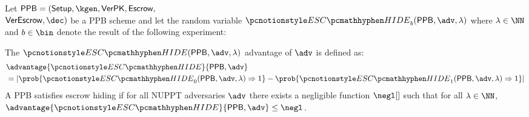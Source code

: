 \begin{definition}
	Let $\ppb = (\setup,\allowbreak \kgen,\allowbreak \verpk,\allowbreak \escrow,$\\ $\allowbreak \verescrow,\allowbreak \dec)$ be a PPB scheme and let the random variable $\eschidegame_b(\ppb, \adv, \secpar)$ where $\secpar \in \NN$ and $b \in \bin$ denote the result of the following experiment:

	The $\eschidegame(\ppb, \adv, \secpar)$ advantage of $\adv$ is defined as:
	\begin{align*}
		 & \advantage{\eschidegame}{\ppb, \adv} \\
		 & = \left|
		\prob{\eschidegame_0(\ppb, \adv, \secpar) \Rightarrow 1} - \prob{\eschidegame_1(\ppb, \adv, \secpar) \Rightarrow 1}
		\right|
	\end{align*}
	A PPB satisfies escrow hiding if for all NUPPT adversaries $\adv$ there exists a negligible function $\negl[]$ such that for all $\secpar \in \NN$, $\advantage{\eschidegame}{\ppb, \adv} \leq \negl$.
\end{definition}
